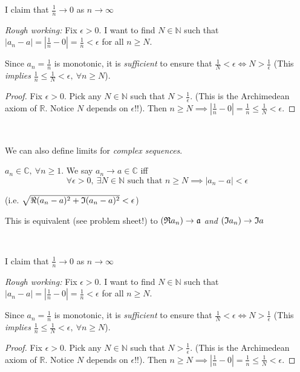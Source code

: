 \begin{example}
I claim that $\frac{1}{n} \to 0$ as $n \to \infty$

\textit{Rough working:} Fix $\epsilon >0$. I want to find $N \in \mathbb{N}$ such that $|a_n - a| = |\frac{1}{n} - 0| = \frac{1}{n} < \epsilon$ for all $n \geq N$. 


Since $a_n = \frac{1}{n}$ is monotonic, it is \emph{sufficient} to ensure that $\frac{1}{N} < \epsilon \iff N > \frac{1}{\epsilon}$ (This \emph{implies} $\frac{1}{n} \leq \frac{1}{N} < \epsilon,~\forall n \geq N$).

\begin{proof}
Fix $\epsilon >0$. %
 Pick any $N \in \mathbb{N}$ such that $N > \frac{1}{\epsilon}$. (This is the Archimedean axiom of $\mathbb{R}$. Notice $N$ depends on $\epsilon$!!). Then $n \geq N \implies |\frac{1}{n}-0| = \frac{1}{n} \leq \frac{1}{N} < \epsilon$.
\end{proof}


\end{example}~



We can also define limits for \emph{complex sequences}.\\

\begin{definition}
$a_n \in \mathbb{C},~\forall n \geq 1$. We say $a_n \to a \in \mathbb{C}$ iff
\[\forall \epsilon >0,~\exists N \in \mathbb{N} \text{ such that } n \geq N \implies |a_n - a| < \epsilon\]	

(i.e. $\sqrt{\Re(a_n-a)^2 + \frak{I}(a_n-a)^2} < \epsilon$) 

This is equivalent (see problem sheet!) to $(\frak{R}a_n) \to \frak{a}$ \emph{and} $(\frak{I}a_n) \to \frak{I}a$
\end{definition}~

\begin{example}
I claim that $\frac{1}{n} \to 0$ as $n \to \infty$

\textit{Rough working:} Fix $\epsilon >0$. I want to find $N \in \mathbb{N}$ such that $|a_n - a| = |\frac{1}{n} - 0| = \frac{1}{n} < \epsilon$ for all $n \geq N$. 


Since $a_n = \frac{1}{n}$ is monotonic, it is \emph{sufficient} to ensure that $\frac{1}{N} < \epsilon \iff N > \frac{1}{\epsilon}$ (This \emph{implies} $\frac{1}{n} \leq \frac{1}{N} < \epsilon,~\forall n \geq N$).

\begin{proof}
Fix $\epsilon >0$. %
 Pick any $N \in \mathbb{N}$ such that $N > \frac{1}{\epsilon}$. (This is the Archimedean axiom of $\mathbb{R}$. Notice $N$ depends on $\epsilon$!!). Then $n \geq N \implies |\frac{1}{n}-0| = \frac{1}{n} \leq \frac{1}{N} < \epsilon$.
\end{proof}


\end{example}~



